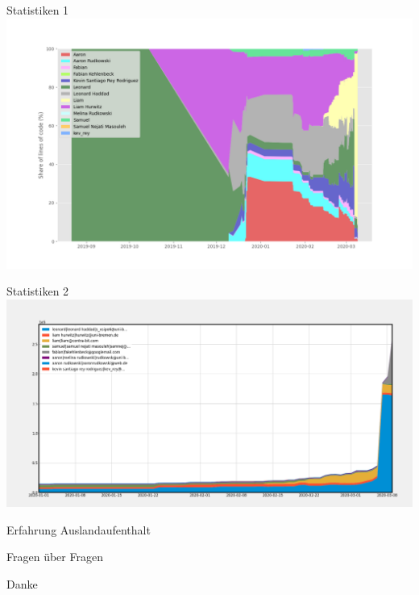\documentclass[presentation]{beamer}
\begin{document}
\begin{frame}[label={sec:org0b53452}]{Statistiken 1}
\includegraphics[width=1\textwidth]{stack.png}
\end{frame}

\begin{frame}{Statistiken 2}
\includegraphics[width=1\textwidth]{ownership.png}  
\end{frame}

\begin{frame}{Erfahrung Auslandaufenthalt}
\end{frame}

\begin{frame}{Fragen über Fragen}
\end{frame}
\begin{frame}{Danke}
\end{frame}
\end{document}
